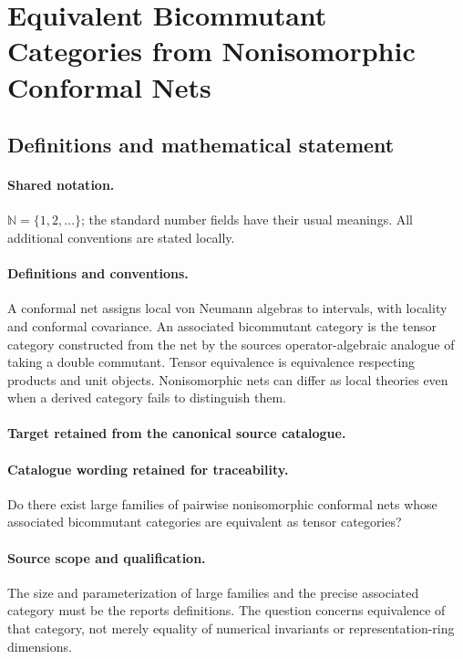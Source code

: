 \documentclass[11pt]{article}
\begin{document}
\section{Equivalent Bicommutant Categories from Nonisomorphic Conformal Nets}\label{statement}

\subsection{Definitions and mathematical statement}

\paragraph{Shared notation.}$\mathbb N=\{1,2,\ldots\}$; the standard number fields have their usual meanings. All additional conventions are stated locally.


\paragraph{Definitions and conventions.}
A conformal net assigns local von Neumann algebras to intervals, with locality and conformal covariance. An associated bicommutant category is the tensor category constructed from the net by the source\textquotesingle s operator-algebraic analogue of taking a double commutant. Tensor equivalence is equivalence respecting products and unit objects. Nonisomorphic nets can differ as local theories even when a derived category fails to distinguish them.

\paragraph{Target retained from the canonical source catalogue.}
\paragraph{Catalogue wording retained for traceability.}
Do there exist large families of pairwise nonisomorphic conformal nets whose associated bicommutant categories are equivalent as tensor categories?

\paragraph{Source scope and qualification.}
The size and parameterization of large families and the precise associated category must be the report\textquotesingle s definitions. The question concerns equivalence of that category, not merely equality of numerical invariants or representation-ring dimensions.
\end{document}
